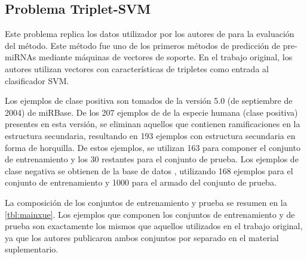 %
%
\subsection{Problema Triplet-SVM}
%
Este problema replica los datos utilizador por los autores de
 \cite{xue} para la evaluación del método.
Este método fue uno de los primeros métodos de predicción de
pre-miRNAs mediante máquinas de vectores de soporte.
En el trabajo original, los autores utilizan vectores con
características de tripletes como entrada al clasificador SVM.

Los ejemplos de clase positiva son tomados de la versión 5.0 (de
septiembre de 2004) de miRBase.
De los 207 ejemplos de  de la especie humana (clase
positiva) presentes en esta versión, se eliminan aquellos que
contienen ramificaciones en la estructura secundaria, resultando en
193 ejemplos con estructura secundaria en forma de horquilla.
De estos ejemplos, se utilizan 163 para componer el conjunto de
entrenamiento y los 30 restantes para el conjunto de prueba.
Los ejemplos de clase negativa se obtienen de la base de datos
, utilizando 168 ejemplos para el conjunto de
entrenamiento y 1000 para el armado del conjunto de prueba.

La composición de los conjuntos de entrenamiento y prueba se resumen
en la \autoref{tbl:mainxue}.
Los ejemplos que componen los conjuntos de entrenamiento y de prueba
son exactamente los mismos que aquellos utilizados en el trabajo
original, ya que los autores publicaron ambos conjuntos por separado
en el material suplementario.
